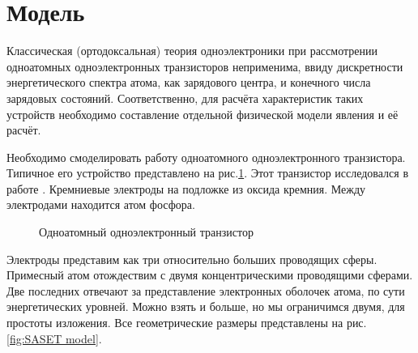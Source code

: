 \documentclass[12pt,a4paper]{report}
\begin{document}
\section*{Модель}

Классическая (ортодоксальная)\cite{Likharev} теория одноэлектроники при рассмотрении одноатомных одноэлектронных транзисторов  неприменима, ввиду дискретности энергетического спектра атома, как зарядового центра, и конечного числа зарядовых состояний. Соответственно, для расчёта характеристик таких устройств необходимо составление отдельной физической модели явления и её расчёт.

Необходимо смоделировать работу  одноатомного одноэлектронного транзистора. Типичное его устройство представлено на рис.\ref{fig:SASET}. Этот транзистор исследовался в работе \cite{patriot}. Кремниевые электроды на подложке из оксида кремния. Между электродами находится атом фосфора. 
\begin{figure}[h]
	\caption{Одноатомный одноэлектронный транзистор}
	\label{fig:SASET}
\end{figure}
Электроды представим как три относительно больших проводящих сферы. Примесный атом отождествим с двумя концентрическими проводящими сферами. Две последних отвечают за представление электронных оболочек атома, по сути энергетических уровней. Можно взять и больше, но мы ограничимся двумя, для простоты изложения. Все геометрические размеры представлены на рис. \ref{fig:SASET model}.
\end{document}
